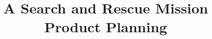 \documentclass{article}
\begin{document}
\title{A Search and Rescue Mission\\
\normalsize Product Planning}

\author{}
\maketitle
\end{document}
